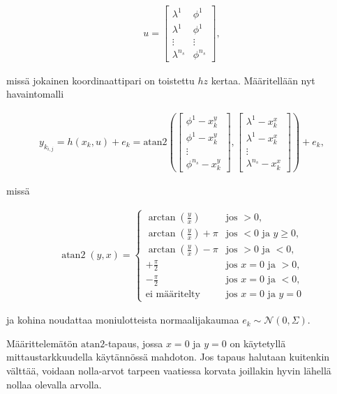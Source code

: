 \documentclass[
  12pt,
  a4paper, twoside]{book}
\begin{document}
\begin{align}
u=\begin{bmatrix} \lambda^1 & \phi^1 \\  \lambda^1 & \phi^1 \\  \vdots & \vdots \\ \lambda^{n_s} & \phi^{n_s} \end{bmatrix},
\end{align}

\noindent missä jokainen koordinaattipari on toistettu \(hz\) kertaa. Määritellään nyt havaintomalli

\begin{align}\label{havaintomalli}
y_{k_{i,j}}=h(x_k, u)+e_k=\text{atan2} \left( \begin{bmatrix}\phi^1-x_k^y\\ \phi^1-x_k^y\\ \vdots \\ \phi^{n_s}-x_k^y\end{bmatrix}, \begin{bmatrix}\lambda^1-x_k^x\\ \lambda^1-x_k^x\\ \vdots \\ \lambda^{n_s}-x_k^x\end{bmatrix} \right) +e_k,
\end{align}

\noindent missä

\begin{align}\label{atan2}
\displaystyle \operatorname{atan2}(y,x)={\begin{cases}\arctan({\frac {y}{x}})&{\text{jos }}>0,\\\arctan({\frac {y}{x}})+\pi &{\text{jos }}<0{\text{ ja }}y\geq 0,\\\arctan({\frac {y}{x}})-\pi & {\text{jos }}>0{\text{ ja }}<0,\\+{\frac {\pi }{2}}&{\text{jos }}x=0{\text{ ja }}>0,\\-{\frac {\pi }{2}}&{\text{jos }}x=0{\text{ ja }}<0,\\{\text{ei määritelty}}&{\text{jos }}x=0{\text{ ja }}y=0\end{cases}}
\end{align}

\noindent ja kohina noudattaa moniulotteista normaalijakaumaa \(e_k\sim\mathcal{N}(0,{\Sigma})\).

Määrittelemätön \(\text{atan2}\)-tapaus, jossa \(x=0\) ja \(y=0\) on käytetyllä mittaustarkkuudella käytännössä mahdoton. Jos tapaus halutaan kuitenkin välttää, voidaan nolla-arvot tarpeen vaatiessa korvata joillakin hyvin lähellä nollaa olevalla arvolla.
\end{document}
